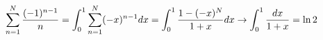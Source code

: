 \documentclass[preview]{standalone}
\begin{document}
\begin{align*}
\special{dvisvgm:raw <g id='unique000'>}\displaystyle\sum_{n=1}^{N}\dfrac{(-1)^{n-1}}{n}=\int_0^1\sum_{n=1}^{N}(-x)^{n-1}dx=\int_0^1\dfrac{1-(-x)^N}{1+x}dx\to\int_0^1\dfrac{dx}{1+x}=\ln 2\special{dvisvgm:raw </g>}
\end{align*}
\end{document}
